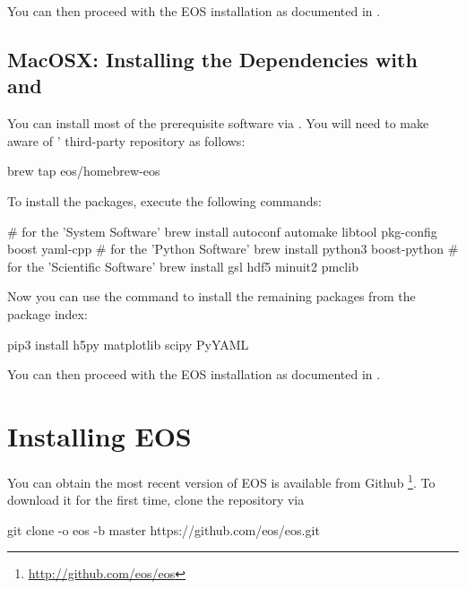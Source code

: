 You can then proceed with the EOS installation as documented in .

\subsection{MacOSX: Installing the Dependencies with  and }

You can install most of the prerequisite software via .
You will need to make  aware of \EOS'
third-party repository as follows:
\begin{commandline}
brew tap eos/homebrew-eos
\end{commandline}

To install the packages, execute the following commands:
\begin{commandline}
# for the 'System Software'
brew install autoconf automake libtool pkg-config boost yaml-cpp
# for the 'Python Software'
brew install python3 boost-python
# for the 'Scientific Software'
brew install gsl hdf5 minuit2 pmclib
\end{commandline}

Now you can use the  command to install the remaining
packages from the  package index:
\begin{commandline}
pip3 install h5py matplotlib scipy PyYAML
\end{commandline}


You can then proceed with the EOS installation as documented in .

\section{Installing EOS}
\label{sec:inst:EOS}

You can obtain the most recent version of EOS is available from Github
\footnote{\url{http://github.com/eos/eos}}.  To download it for the first time,
clone the repository via
%
\begin{commandline}
git clone -o eos -b master https://github.com/eos/eos.git
\end{commandline}

